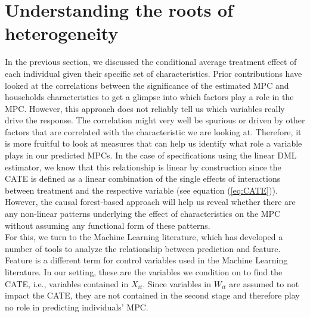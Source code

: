 \section{Understanding the roots of heterogeneity} \label{sec:roots_of_heterogeneity}
In the previous section, we discussed the conditional average treatment effect of each individual given their specific set of characteristics. Prior contributions have looked at the correlations between the significance of the estimated MPC and households characteristics to get a glimpse into which factors play a role in the MPC. However, this approach does not reliably tell us which variables really drive the response. The correlation might very well be spurious or driven by other factors that are correlated with the characteristic we are looking at. Therefore, it is more fruitful to look at measures that can help us identify what role a variable plays in our predicted MPCs. In the case of specifications using the linear DML estimator, we know that this relationship is linear by construction since the CATE is defined as a linear combination of the single effects of interactions between treatment and the respective variable (see equation (\ref{eq:CATE})). However, the causal forest-based approach will help us reveal whether there are any non-linear patterns underlying the effect of characteristics on the MPC without assuming any functional form of these patterns. \\
For this, we turn to the Machine Learning literature, which has developed a number of tools to analyze the relationship between prediction and feature. Feature is a different term for control variables used in the Machine Learning literature. In our setting, these are the variables we condition on to find the CATE, i.e., variables contained in $X_{it}$. Since variables in $W_{it}$ are assumed to not impact the CATE, they are not contained in the second stage and therefore play no role in predicting individuals' MPC.

